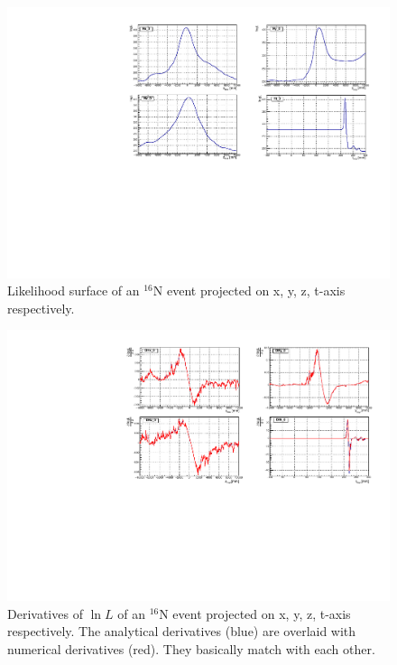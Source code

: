 \begin{figure}
	\centering
	\includegraphics[width=160mm]{logL_xyzt.pdf}
	\caption{Likelihood surface of an {$^{16}$}N event projected on x, y, z, t-axis respectively.}
	\label{logLxyz}
\end{figure}

\begin{figure}
	\centering
	\includegraphics[width=160mm]{derivativeLogL_xyzt.pdf}
	\caption[Derivatives of $\ln L$ of an {$^{16}$}N event projected on x, y, z, t-axis respectively.]{Derivatives of $\ln L$ of an {$^{16}$}N event projected on x, y, z, t-axis respectively. The analytical derivatives (blue) are overlaid with numerical derivatives (red). They basically match with each other.\label{derivative_logLxyz}}
\end{figure}

